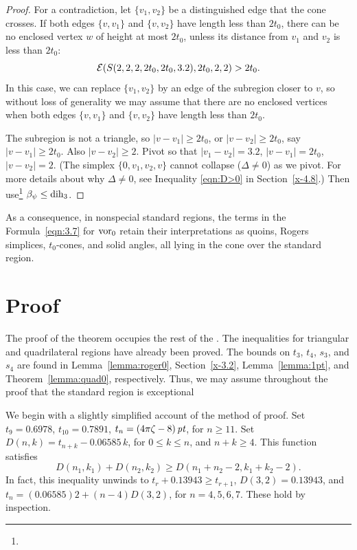 \begin{proof}
For a contradiction, let $\{v_1,v_2\}$ be a distinguished edge that
the cone crosses. If both edges $\{v,v_1\}$ and $\{v,v_2\}$ have
length less than $2t_0$, there can be no enclosed vertex $w$ of
height at most $2t_0$, unless its distance from $v_1$ and $v_2$ is
less than $2t_0$:
    $${\mathcal E}(S(2,2,2,2t_0,2t_0,3.2),2t_0,2,2)>2t_0.$$
In this case, we can replace $\{v_1,v_2\}$ by an edge of the
subregion closer to $v$, so without loss of generality we may
assume that there are no enclosed vertices when both edges
$\{v,v_1\}$ and $\{v,v_2\}$ have length less than $2t_0$.

The subregion is not a triangle, so $|v-v_1|\ge 2t_0$, or
$|v-v_2|\ge 2t_0$, say $|v-v_1|\ge 2t_0$. Also $|v-v_2|\ge2$.
Pivot so that $|v_1-v_2|=3.2$, $|v-v_1|=2t_0$, $|v-v_2|=2$.  (The
simplex $\{0,v_1,v_2,v\}$ cannot collapse ($\Delta\ne0$) as we
pivot. For more details about why $\Delta\ne0$, see Inequality
\ref{eqn:D>0} in Section~\ref{x-4.8}.)
Then use\footnote{} %
 $\beta_\psi\le \operatorname{dih}_3$.
\end{proof}

As a consequence, in nonspecial standard regions, the terms in the
Formula~\ref{eqn:3.7} for $\operatorname{vor}_0$ retain their interpretations as
quoins, Rogers simplices, $t_0$-cones, and solid angles, all lying
in the cone over the standard region.


\section{Proof}

The proof of the theorem occupies the rest of the \chap. The
inequalities for triangular and quadrilateral regions have already
been proved. The bounds on $t_3$, $t_4$, $s_3$, and $s_4$ are
found in Lemma~\ref{lemma:roger0}, Section~\ref{x-3.2},
Lemma~\ref{lemma:1pt}, and Theorem~\ref{lemma:quad0},
respectively. Thus, we may assume throughout the proof that the
standard region is exceptional

We begin with a slightly simplified account of the method of
proof. Set $t_9=0.6978$, $t_{10}= 0.7891$, $t_n=(4\pi\zeta-8)\,\hbox{\it pt}$, for
$n\ge 11$. Set $D(n,k) = t_{n+k} - 0.06585\,k$, for $0\le k\le n$,
and $n+k\ge 4$. This function satisfies
    \begin{equation}
    D(n_1,k_1)+D(n_2,k_2)\ge D(n_1+n_2-2,k_1+k_2-2).
    \label{eqn:D-superadd}
    \end{equation}
In fact, this inequality unwinds to $t_r+0.13943\ge t_{r+1}$,
$D(3,2)=0.13943$, and $t_n =(0.06585)2+(n-4)D(3,2)$, for $n=4,5,6,7$.
These hold  by inspection.

